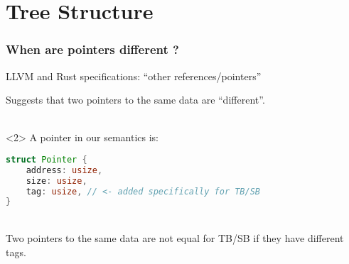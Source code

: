 \section{Tree Structure}


\begin{frame}[fragile, t]
    \frametitle{When are pointers different ?}
    LLVM and Rust specifications: ``other references/pointers''

    Suggests that two pointers to the same data are ``different''.\\~\\

    \begin{onlyenv}<2>
        A pointer in our semantics is:
        \begin{lstlisting}[language=rust]
struct Pointer {
    address: usize,
    size: usize,
    tag: usize, // <- added specifically for TB/SB
}
        \end{lstlisting}~\\

        Two pointers to the same data are not equal for TB/SB
        if they have different tags.
    \end{onlyenv}
\end{frame}

